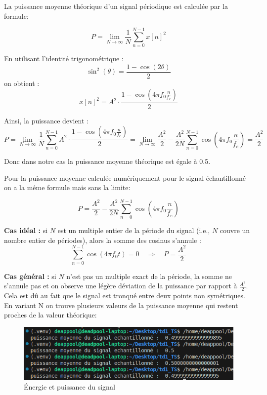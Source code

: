 La puissance moyenne théorique d’un signal périodique est calculée par la  formule:

\[
P = \lim_{N \to \infty} \frac{1}{N} \sum_{n=0}^{N-1} x[n]^2
\]

En utilisant l’identité trigonométrique :
\[
\sin^2(\theta) = \frac{1 - \cos(2\theta)}{2}
\]
on obtient :
\[
x[n]^2 = A^2 \cdot \frac{1 - \cos\left(4\pi f_0 \frac{n}{f_e} \right)}{2}
\]

Ainsi, la puissance devient :
\[
P = \lim_{N \to \infty} \frac{1}{N} \sum_{n=0}^{N-1} A^2 \cdot \frac{1 - \cos\left(4\pi f_0 \frac{n}{f_e} \right)}{2}
= \lim_{N \to \infty}  \frac{A^2}{2} - \frac{A^2}{2N} \sum_{n=0}^{N-1} \cos\left(4\pi f_0 \frac{n}{f_e} \right)
= \frac{A^2}{2}
\] 

Donc dans notre cas la puissance moyenne théorique est égale à 0.5.

Pour la puissance moyenne calculée numériquement pour le signal échantillonné on a la méme formule mais sans la limite:

\[
P = \frac{A^2}{2} - \frac{A^2}{2N} \sum_{n=0}^{N-1} \cos\left(4\pi f_0 \frac{n}{f_e} \right)
\] 

\textbf{Cas idéal :} si $N$ est un multiple entier de la période du signal (i.e., $N$ couvre un nombre entier de périodes), alors la somme des cosinus s’annule :
\[
\sum_{n=0}^{N-1} \cos\left(4\pi f_0 t \right) = 0 \quad \Rightarrow \quad P = \frac{A^2}{2}
\]

\textbf{Cas général :} si $N$ n’est pas un multiple exact de la période, la somme ne s’annule pas et on observe une légère déviation de la puissance par rapport à $\frac{A^2}{2}$. Cela est dû au fait que le signal est tronqué entre deux points non symétriques.\\

En variant N on trouve plusieurs valeurs de la puissance moyenne qui restent proches de la valeur théorique:

\begin{figure}[!h]
\centering
\includegraphics[width=15cm]{screenshots/puissance_et_energie.png}
\caption{Énergie et puissance du signal}
\end{figure}

